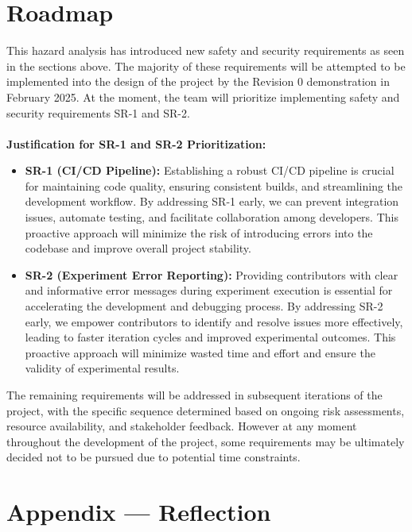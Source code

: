 \documentclass{article}
\begin{document}
\section{Roadmap}

This hazard analysis has introduced new safety and security requirements as seen in the sections above. The majority of these requirements will be attempted to be implemented into the design of the project by the Revision 0 demonstration in February 2025. At the moment, the team will prioritize implementing safety and security requirements SR-1 and SR-2.
\\\\
\textbf{Justification for SR-1 and SR-2 Prioritization:}
\begin{itemize}
    \item \textbf{SR-1 (CI/CD Pipeline):} Establishing a robust CI/CD pipeline is crucial for maintaining code quality, ensuring consistent builds, and streamlining the development workflow. By addressing SR-1 early, we can prevent integration issues, automate testing, and facilitate collaboration among developers. This proactive approach will minimize the risk of introducing errors into the codebase and improve overall project stability.
    \item \textbf{SR-2 (Experiment Error Reporting):} Providing contributors with clear and informative error messages during experiment execution is essential for accelerating the development and debugging process. By addressing SR-2 early, we empower contributors to identify and resolve issues more effectively, leading to faster iteration cycles and improved experimental outcomes. This proactive approach will minimize wasted time and effort and ensure the validity of experimental results.
\end{itemize}
The remaining requirements will be addressed in subsequent iterations of the project, with the specific sequence determined based on ongoing risk assessments, resource availability, and stakeholder feedback. However at any moment throughout the development of the project, some requirements may be ultimately decided not to be pursued due to potential time constraints.

\newpage{}

\section*{Appendix --- Reflection}


\end{document}
